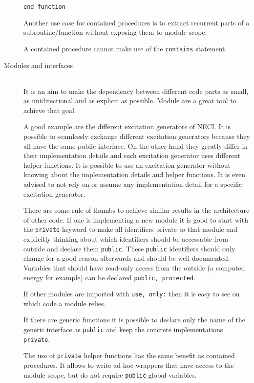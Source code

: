 \documentclass[a4paper,notitlepage,dvipsnames]{scrreprt}
\newcommand\headitem[1]{\needspace{1.5\baselineskip}\item[{\boldmath #1 \nopagebreak}] \hfill \\ \nopagebreak}
\let\code\lstinline
\begin{document}
\begin{description}
\begin{lstlisting}[gobble=12]
            end function
		\end{lstlisting}

        Another use case for contained procedures is to
        extract recurrent parts of a subroutine/function without
        exposing them to module scope.

        A contained procedure cannot make use of the \code{contains} statement.

	\headitem{Modules and interfaces}
        It is an aim to make the dependency between different code parts
        as small, as unidirectional and as explicit as possible.
        Module are a great tool to achieve that goal.

        A good example are the different excitation generators of NECI.
        It is possible to seamlessly exchange different excitation
        generators because they all have the same public interface.
        On the other hand they greatly differ in their implementation
        details and each excitation generator uses different helper functions.
        It is possible to use an excitation generator without knowing
        about the implementation details and helper functions.
        It is even advised to not rely on or assume any implementation detail
        for a specific excitation generator.

        There are some rule of thumbs to achieve similar results in the
        architecture of other code.
        If one is implementing a new module it is good to start
        with the \code{private} keyword to make all identifiers private to that
        module and explicitly thinking about which identifiers should be
        accessable from outside and declare them \code{public}.
        These \code{public} identifiers should only change for a good
        reason afterwards and should be well documented.
        Variables that should have read-only access from the outside
        (a computed energy for example) can be declared
        \code{public, protected}.

        If other modules are imported with \code{use, only:} then it
        is easy to see on which code a module relies.

        If there are generic functions it is possible to declare only
        the name of the generic interface as \code{public} and keep
        the concrete implementations \code{private}.

        The use of \code{private} helper functions has the same
        benefit as contained procedures.
        It allows to write ad-hoc wrappers that have access to the
        module scope, but do not require \code{public} global variables.


\end{description}
\end{document}
